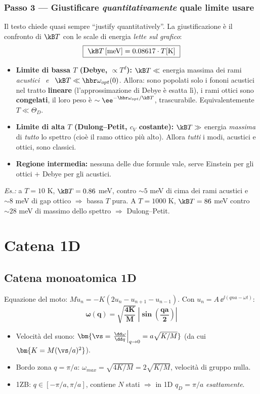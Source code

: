 \subsubsection*{Passo 3 --- Giustificare \emph{quantitativamente} quale limite usare}
Il testo chiede quasi sempre ``justify quantitatively''. La giustificazione è il confronto di $\kB T$ con le scale di energia \emph{lette sul grafico}:
\[ \boxed{\ \kB T\,[\text{meV}] = 0.08617\cdot T[\text{K}]\ } \]
\begin{itemize}
  \item \textbf{Limite di bassa $T$ (Debye, $\propto T^{d}$):} $\kB T \ll$ energia massima dei rami \emph{acustici} \ \emph{e} \ $\kB T\ll \hbr\omega_{opt}(0)$. Allora: sono popolati solo i fononi acustici nel tratto \textbf{lineare} (l'approssimazione di Debye è esatta lì),  i rami ottici sono \textbf{congelati}, il loro peso è $\sim\ee^{-\hbr\omega_{opt}/\kB T}$, trascurabile. Equivalentemente $T\ll\Theta_D$.
  \item \textbf{Limite di alta $T$ (Dulong--Petit, $c_V$ costante):} $\kB T\gg$ energia \emph{massima} di \emph{tutto} lo spettro (cioè il ramo ottico più alto). Allora \emph{tutti} i modi, acustici e ottici, sono classici.
  \item \textbf{Regione intermedia:} nessuna delle due formule vale, serve Einstein per gli ottici $+$ Debye per gli acustici.
\end{itemize}
\textit{Es.:} a $T=10$ K, $\kB T=0.86$ meV, contro $\sim5$ meV di cima dei rami acustici e $\sim8$ meV di gap ottico $\Rightarrow$ bassa $T$ pura. A $T=1000$ K, $\kB T=86$ meV contro $\sim28$ meV di massimo dello spettro $\Rightarrow$ Dulong--Petit.

\newpage
\section{Catena 1D}

\subsection{Catena monoatomica 1D}
Equazione del moto: $M\ddot u_n = -K(2u_n - u_{n+1} - u_{n-1})$. Con $u_n = A\,\ee^{\ii(qna-\omega t)}$:
\[ \bm{\omega(q) = \sqrt{\frac{4K}{M}}\;\left|\sin\!\left(\frac{qa}{2}\right)\right|} \]
\begin{itemize}
  \item Velocità del suono: $\bm{\vs = \left.\frac{\dd\omega}{\dd q}\right|_{q\to0} = a\sqrt{K/M}}$ \quad(da cui $\bm{K = M(\vs/a)^2}$).
  \item Bordo zona $q=\pi/a$: $\omega_{max}=\sqrt{4K/M}=2\sqrt{K/M}$, velocità di gruppo nulla.
  \item 1ZB: $q\in[-\pi/a,\pi/a]$, contiene $N$ stati $\Rightarrow$ in 1D $q_D = \pi/a$ \emph{esattamente}.
\end{itemize}

